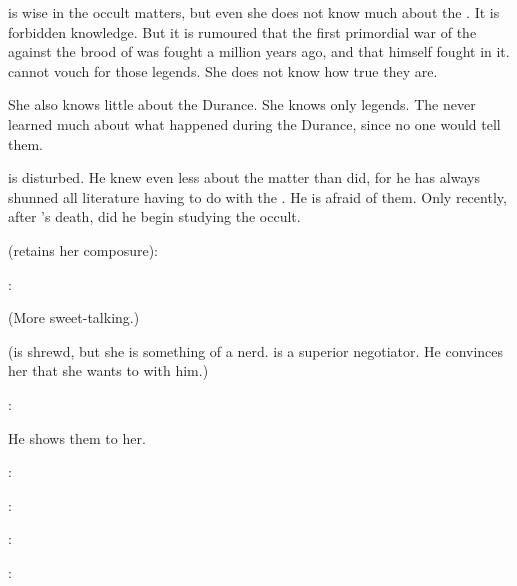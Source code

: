 \Urizeth is wise in the occult matters, but even she does not know much about the \SitraAchras.
It is forbidden knowledge. 
But it is rumoured that the first primordial war of the \SitraAchras against the brood of \Sethicus was fought a million years ago, and that \Ishnaruchaefir himself fought in it. 
\Urizeth cannot vouch for those legends. 
She does not know how true they are. 

She also knows little about the Durance. 
She knows only legends. 
The \resphain never learned much about what happened during the Durance, since no one would tell them. 

\Teshrial is disturbed.
He knew even less about the matter than \Urizeth did, for he has always shunned all literature having to do with the \SitraAchras.
He is afraid of them. 
Only recently, after \Urizeth's death, did he begin studying the occult. 


\Urizeth (retains her composure):  

\Teshrial: 

(More sweet-talking.)

(\Urizeth is shrewd, but she is something of a nerd. \Teshrial is a superior negotiator. He convinces her that she wants to \cooperate with him.) 



\begin{comment}
  \section{Lothagiel's notes}
\end{comment}

\Urizeth:

He shows them to her.

\Urizeth: 

\Teshrial:

\Urizeth: 

\Teshrial: 

